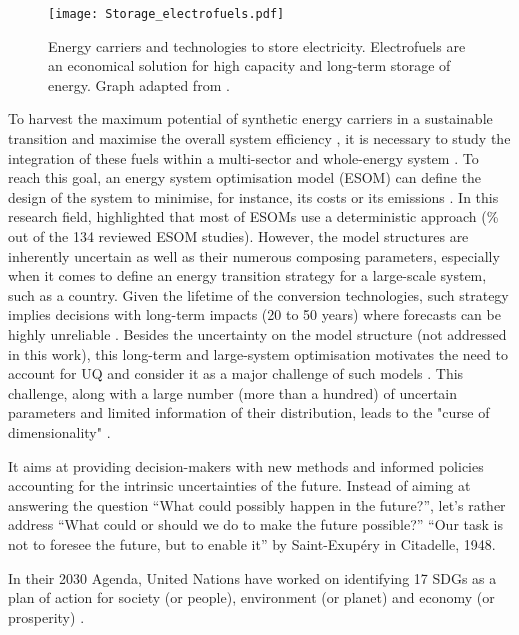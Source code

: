 \begin{figure}[htbp!]
\centering
\texttt{[image: Storage\_electrofuels.pdf]}
\caption{Energy carriers and technologies to store electricity. Electrofuels are an economical solution for high capacity and long-term storage of energy. Graph adapted from \cite{ISPT2017}.}
\label{fig:intro:Storage_electrofuels}
\end{figure}

To harvest the maximum potential of synthetic energy carriers in a sustainable transition and maximise the overall system efficiency \cite{mathiesen2015}, it is necessary to study the integration of these fuels within a multi-sector and whole-energy system \cite{Contino2020}. To reach this goal, an energy system optimisation model (ESOM) can define the design of the system to minimise, for instance, its costs or its emissions \cite{zeng2011review}. In this research field, \citet{yue2018review} highlighted that most of ESOMs use a deterministic approach (\% out of the 134 reviewed ESOM studies). However, the model structures are inherently uncertain as well as their numerous composing parameters, especially when it comes to define an energy transition strategy for a large-scale system, such as a country. Given the lifetime of the conversion technologies, such strategy implies decisions with long-term impacts (20 to 50 years) where forecasts can be highly unreliable \cite{Moret2017}. Besides the uncertainty on the model structure (not addressed in this work), this long-term and large-system optimisation motivates the need to account for \gls{UQ} and consider it as a major challenge of such models \cite{pfenninger2014energy}. This challenge, along with a large number (\ie more than a hundred) of uncertain parameters and limited information of their distribution, leads to the "curse of dimensionality" \cite{kuo2005lifting}.


It aims at providing decision-makers with new methods and informed policies accounting for the intrinsic uncertainties of the future.  Instead of aiming at answering the question ``What could possibly happen in the future?'', let's rather address ``What could or should we do to make the future possible?'' ``Our task is not to foresee the future, but to enable it'' by Saint-Exupéry in Citadelle, 1948.




In their 2030 Agenda, United Nations have worked on identifying 17 \gls{SDGs} as a plan of action for society (or people), environment (or planet) and economy (or prosperity) \cite{un_sdgs}. 
%
%

